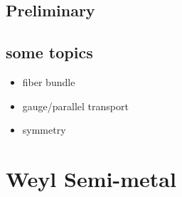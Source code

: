 \documentclass[letterpaper,10pt,english]{sphinxmanual}
\begin{document}
\subsection{Preliminary}
\label{TI/Berry's Phase/Preliminary:id1}\label{TI/Berry's Phase/Preliminary::doc}\label{TI/Berry's Phase/Preliminary:preliminary}

\subsection{some topics}
\label{TI/Berry's Phase/main:some-topics}\begin{itemize}
\item {} 
fiber bundle

\item {} 
gauge/parallel transport

\item {} 
symmetry

\end{itemize}


\section{Weyl Semi-metal}
\label{TI/Weyl_semi-metal:id1}\label{TI/Weyl_semi-metal::doc}\label{TI/Weyl_semi-metal:weyl-semi-metal}
\end{document}
